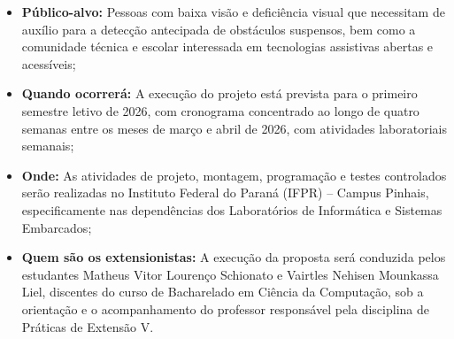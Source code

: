 \begin{itemize}
    \item \textbf{Público-alvo:} Pessoas com baixa visão e deficiência visual que necessitam de auxílio para a detecção antecipada de obstáculos suspensos, bem como a comunidade técnica e escolar interessada em tecnologias assistivas abertas e acessíveis;
    \item \textbf{Quando ocorrerá:} A execução do projeto está prevista para o primeiro semestre letivo de 2026, com cronograma concentrado ao longo de quatro semanas entre os meses de março e abril de 2026, com atividades laboratoriais semanais;
    \item \textbf{Onde:} As atividades de projeto, montagem, programação e testes controlados serão realizadas no Instituto Federal do Paraná (IFPR) -- Campus Pinhais, especificamente nas dependências dos Laboratórios de Informática e Sistemas Embarcados;
    \item \textbf{Quem são os extensionistas:} A execução da proposta será conduzida pelos estudantes Matheus Vitor Lourenço Schionato e Vairtles Nehisen Mounkassa Liel, discentes do curso de Bacharelado em Ciência da Computação, sob a orientação e o acompanhamento do professor responsável pela disciplina de Práticas de Extensão V.
\end{itemize}
